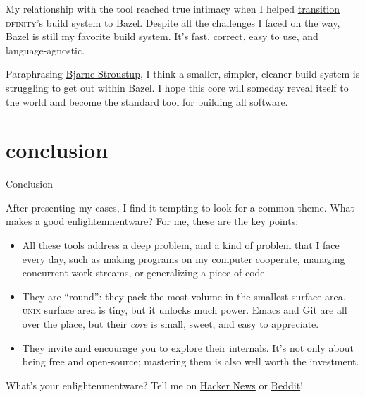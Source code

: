 \documentclass{article}
\begin{document}
My relationship with the tool reached true intimacy when I helped \href{/posts/17-scaling-rust-builds-with-bazel.html}{transition \textsc{dfinity}'s build system to Bazel}.
Despite all the challenges I faced on the way, Bazel is still my favorite build system.
It's fast, correct, easy to use, and language-agnostic.

Paraphrasing \href{https://www.stroustrup.com/quotes.html}{Bjarne Stroustup}, I think a smaller, simpler, cleaner build system is struggling to get out within Bazel.
I hope this core will someday reveal itself to the world and become the standard tool for building all software.

\section{conclusion}{Conclusion}

After presenting my cases, I find it tempting to look for a common theme.
What makes a good enlightenmentware?
For me, these are the key points:

\begin{itemize}
  \item
  All these tools address a deep problem, and a kind of problem that I face every day, such as making programs on my computer cooperate, managing concurrent work streams, or generalizing a piece of code.
  \item
  They are ``round'': they pack the most volume in the smallest surface area.
  \textsc{unix} surface area is tiny, but it unlocks much power.
  Emacs and Git are all over the place, but their \emph{core} is small, sweet, and easy to appreciate.
  \item
  They invite and encourage you to explore their internals.
  It's not only about being free and open-source; mastering them is also well worth the investment.
\end{itemize}

What's your enlightenmentware? Tell me on \href{https://news.ycombinator.com/item?id=40419856}{Hacker News} or \href{https://www.reddit.com/r/programming/comments/1cwa1m8/blog_post_enlightenmentware/}{Reddit}!
\end{document}
